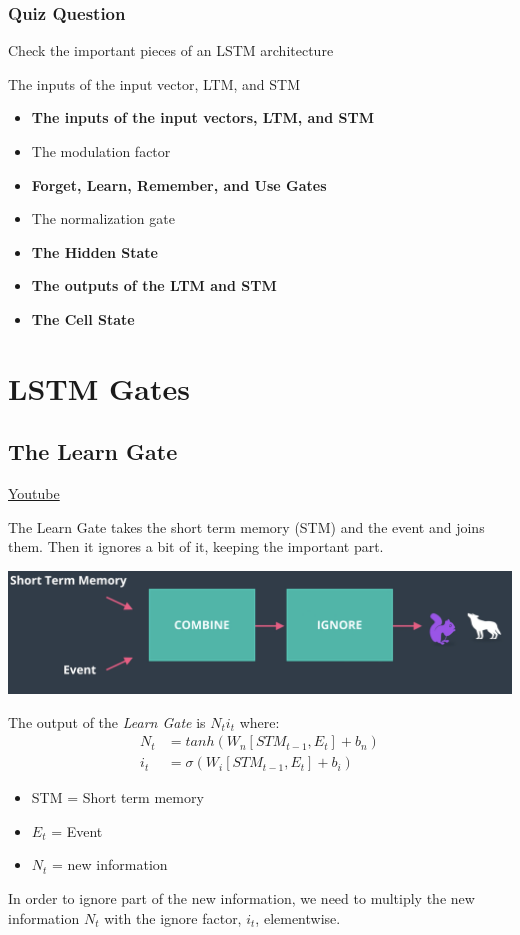 \subsubsection{Quiz Question}

Check the important pieces of an LSTM architecture

The inputs of the input vector, LTM, and STM
\begin{itemize}
    \item \textbf{The inputs of the input vectors, LTM, and STM}
    \item The modulation factor
    \item \textbf{Forget, Learn, Remember, and Use Gates}
    \item The normalization gate
    \item \textbf{The Hidden State}
    \item \textbf{The outputs of the LTM and STM}
    \item \textbf{The Cell State}
\end{itemize}

\section{LSTM Gates}

\subsection{The Learn Gate}
\href{https://www.youtube.com/watch?v=aVHVI7ovbHY&t=2s&ab_channel=Udacity}{Youtube} \newline

The Learn Gate takes the short term memory (STM) and the event and joins them. Then it ignores a bit of it, keeping the important part. 

\includegraphics[width=1\linewidth]{img//rnn//lstm/learngate1.png}

The output of the \textit{Learn Gate} is \(N_t i_t\) where: 
\begin{equation} \label{eq:LearnGate}
\begin{split}
     N_t &= tanh(W_n [STM_{t-1}, E_t] + b_n) \\
    i_t &= \sigma(W_i [STM_{t-1}, E_t] + b_i)
\end{split}
\end{equation}
\begin{itemize}
    \item STM = Short term memory
    \item \(E_t\) = Event
    \item \(N_t\) = new information
\end{itemize}
In order to ignore part of the new information, we need to multiply the new information \(N_t\) with the ignore factor, \(i_t\), elementwise. 

